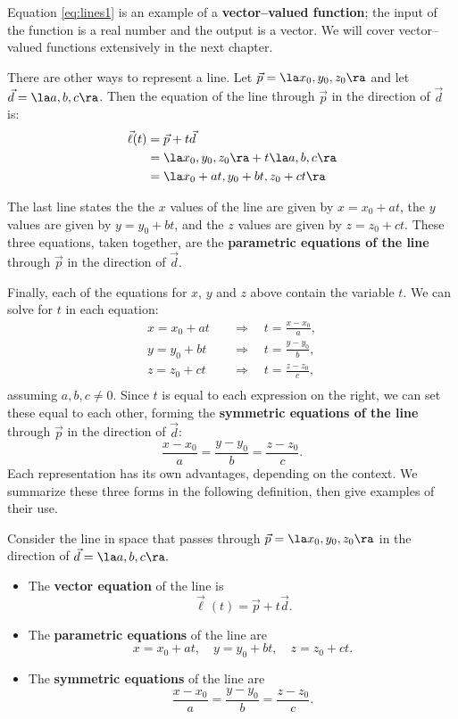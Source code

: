Equation \eqref{eq:lines1} is an example of a \textbf{vector--valued function}; the input of the function is a real number and the output is a vector. We will cover vector--valued functions extensively in the next chapter.

There are other ways to represent a line. Let $\vec p = \la x_0,y_0,z_0\ra$ and let $\vec d = \la a,b,c\ra$. Then the equation of the line through $\vec p$ in the direction of $\vec d$ is:
\begin{align*}
\vec\ell(t) &= \vec p + t\vec d \\
						&= \la x_0,y_0,z_0\ra + t\la a,b,c\ra \\
						&= \la x_0 + at, y_0+bt, z_0+ct\ra
\end{align*}

The last line states the the $x$ values of the line are given by $x=x_0+at$, the $y$ values are given by $y = y_0+bt$, and the $z$ values are given by $z = z_0 + ct$. These three equations, taken together, are the \textbf{parametric equations of the line} through $\vec p$ in the direction of $\vec d$.

Finally, each of the equations for $x$, $y$ and $z$ above contain the variable $t$. We can solve for $t$ in each equation:
\begin{align*}
x = x_0+at \quad&\Rightarrow\quad t=\frac{x-x_0}{a},\\
y=y_0+bt \quad&\Rightarrow\quad t = \frac{y-y_0}{b},\\
z = z_0+ct \quad&\Rightarrow\quad t = \frac{z-z_0}{c},\\
\end{align*}
assuming $a,b,c\neq 0$.
Since $t$ is equal to each expression on the right, we can set these equal to each other, forming the \textbf{symmetric equations of the line} through $\vec p$ in the direction of $\vec d$:
$$\frac{x-x_0}{a} = \frac{y-y_0}{b}=\frac{z-z_0}{c}.$$
Each representation has its own advantages, depending on the context. We summarize these three forms in the following definition, then give examples of their use.
\clearpage

{Consider the line in space that passes through $\vec p = \la x_0,y_0,z_0\ra$ in the direction of $\vec d = \la a,b,c\ra.$
\begin{itemize}
	\item The \textbf{vector equation} of the line is $$\vec \ell(t) = \vec p+t\vec d.$$
	\item	The \textbf{parametric equations} of the line are
	$$x = x_0+at, \quad y=y_0+bt, \quad z = z_0+ct .$$
	\item	The \textbf{symmetric equations} of the line are
	$$\frac{x-x_0}{a} = \frac{y-y_0}{b}=\frac{z-z_0}{c}.$$
\end{itemize}
}

